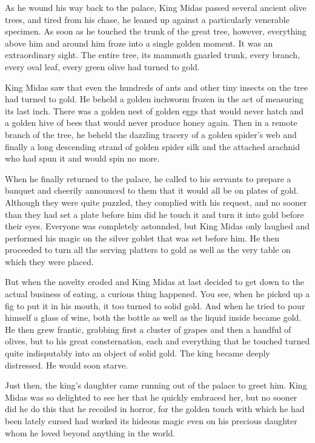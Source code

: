 As he wound his way back to the palace, King Midas passed several ancient olive trees, and tired from his chase, he leaned up against a particularly venerable specimen. As soon as he touched the trunk of the great tree, however, everything above him and around him froze into a single golden moment. It was an extraordinary sight. The entire tree, its mammoth gnarled trunk, every branch, every oval leaf, every green olive had turned to gold.

King Midas saw that even the hundreds of ants and other tiny insects on the tree had turned to gold. He beheld a golden inchworm frozen in the act of measuring its last inch. There was a golden nest of golden eggs that would never hatch and a golden hive of bees that would never produce honey again. Then in a remote branch of the tree, he beheld the dazzling tracery of a golden spider's web and finally a long descending strand of golden spider silk and the attached arachnid who had spun it and would spin no more.

When he finally returned to the palace, he called to his servants to prepare a banquet and cheerily announced to them that it would all be on plates of gold. Although they were quite puzzled, they complied with his request, and no sooner than they had set a plate before him did he touch it and turn it into gold before their eyes. Everyone was completely astounded, but King Midas only laughed and performed his magic on the silver goblet that was set before him. He then proceeded to turn all the serving platters to gold as well as the very table on which they were placed.

But when the novelty eroded and King Midas at last decided to get down to the actual business of eating, a curious thing happened. You see, when he picked up a fig to put it in his mouth, it too turned to solid gold. And when he tried to pour himself a glass of wine, both the bottle as well as the liquid inside became gold. He then grew frantic, grabbing first a cluster of grapes and then a handful of olives, but to his great consternation, each and everything that he touched turned quite indisputably into an object of solid gold. The king became deeply distressed. He would soon starve.

Just then, the king's daughter came running out of the palace to greet him. King Midas was so delighted to see her that he quickly embraced her, but no sooner did he do this that he recoiled in horror, for the golden touch with which he had been lately cursed had worked its hideous magic even on his precious daughter whom he loved beyond anything in the world.

